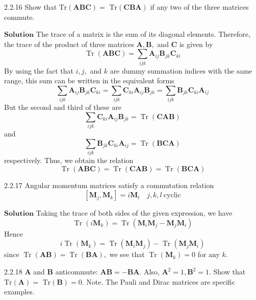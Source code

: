 \documentclass{styles/kaobook}
\begin{document}
\begin{greenbox}{2.2.16}
Show that $\text{Tr}(\mathbf{ABC})=$ $\text{Tr}(\mathbf{CBA})$ if any two of the three matrices commute.
\end{greenbox}



$\boxed{\textbf{Solution}}$  The trace of a matrix is the sum of its diagonal elements. Therefore, the trace of the product of three matrices $\mathbf{A}, \mathbf{B},$ and $\mathbf{C}$ is
given by
$$
\operatorname{Tr}(\mathbf{A} \mathbf{B} \mathbf{C})=\sum_{i j k} \mathbf{A}_{i j} \mathbf{B}_{j k} \mathbf{C}_{k i}
$$
By using the fact that $i, j,$ and $k$ are dummy summation indices
with the same range, this sum can be written in the equivalent
forms
$$
\sum_{i j k} \mathbf{A}_{i j} \mathbf{B}_{j k} \mathbf{C}_{k i}=\sum_{i j k} \mathbf{C}_{k i} \mathbf{A}_{i j} \mathbf{B}_{j k}=\sum_{i j k} \mathbf{B}_{j k} \mathbf{C}_{k i} \mathbf{A}_{i j}
$$
But the second and third of these are
$$
\sum_{i j k} \mathbf{C}_{k i} \mathbf{A}_{i j} \mathbf{B}_{j k}=\operatorname{Tr}(\mathbf{C} \mathbf{A} \mathbf{B})
$$
and
$$
\sum_{i j k} \mathbf{B}_{j k} \mathbf{C}_{k i} \mathbf{A}_{i j}=\operatorname{Tr}(\mathbf{B} \mathbf{C} \mathbf{A})
$$
respectively. Thus, we obtain the relation
$$
\operatorname{Tr}(\mathbf{A} \mathbf{B} \mathbf{C})=\operatorname{Tr}(\mathbf{C} \mathbf{A} \mathbf{B})=\operatorname{Tr}(\mathbf{B} \mathbf{C} \mathbf{A})
$$


\begin{greenbox}{2.2.17}
Angular momentum matrices satisfy a commutation relation
$$[\mathbf{M}_j,\mathbf{M}_k]=i\mathbf{M}_l \quad j,k,l \ \text{cyclic}$$
\end{greenbox}



$\boxed{\textbf{Solution}}$  Taking the trace of both sides of the given expression, we have
$$
\operatorname{Tr}\left(i \mathbf{M}_{k}\right)=\operatorname{Tr}\left(\mathbf{M}_{i} \mathbf{M}_{j}-\mathbf{M}_{j} \mathbf{M}_{i}\right)
$$
Hence
$$
i \operatorname{Tr}\left(\mathbf{M}_{k}\right)=\operatorname{Tr}\left(\mathbf{M}_{i} \mathbf{M}_{j}\right)-\operatorname{Tr}\left(\mathbf{M}_{j} \mathbf{M}_{i}\right)
$$
since $\operatorname{Tr}(\mathbf{A}\mathbf{B})=\operatorname{Tr}(\mathbf{B}\mathbf{A}),$ we see that $\operatorname{Tr}\left(\mathbf{M}_{k}\right)=0$ for any $k .$



\begin{greenbox}{2.2.18}
$\mathbf{A}$ and $\mathbf{B}$ anticommute: $\mathbf{A}\mathbf{B}=-\mathbf{B}\mathbf{A}$. Also, $\mathbf{A}^{2}=1, \mathbf{B}^{2}=1 .$ Show that $\text{Tr}(\mathbf{A})=$
$\text{Tr}(\mathbf{B})=0 .$
Note. The Pauli and Dirac matrices are specific examples.
\end{greenbox}
\end{document}
